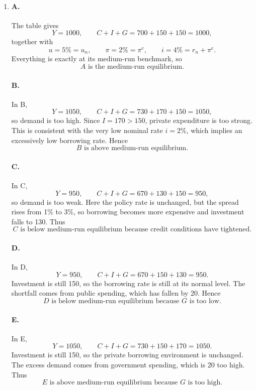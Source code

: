 \documentclass[12pt]{article}
\begin{document}
\begin{enumerate}[label=(\alph*)]
    \item
    \paragraph{A.}
    The table gives
    \[
    Y=1000,
    \qquad
    C+I+G=700+150+150=1000,
    \]
    together with
    \[
    u=5\%=u_n,
    \qquad
    \pi=2\%=\pi^e,
    \qquad
    i=4\%=r_n+\pi^e.
    \]
    Everything is exactly at its medium-run benchmark, so
    \[
    \boxed{A \text{ is the medium-run equilibrium.}}
    \]

    \paragraph{B.}
    In B,
    \[
    Y=1050,
    \qquad
    C+I+G=730+170+150=1050,
    \]
    so demand is too high. Since \(I=170>150\), private expenditure is too strong. This is consistent with the very low nominal rate \(i=2\%\), which implies an excessively low borrowing rate. Hence
    \[
    \boxed{B \text{ is above medium-run equilibrium.}}
    \]

    \paragraph{C.}
    In C,
    \[
    Y=950,
    \qquad
    C+I+G=670+130+150=950,
    \]
    so demand is too weak. Here the policy rate is unchanged, but the spread rises from 1\% to 3\%, so borrowing becomes more expensive and investment falls to 130. Thus
    \[
    \boxed{C \text{ is below medium-run equilibrium because credit conditions have tightened.}}
    \]

    \paragraph{D.}
    In D,
    \[
    Y=950,
    \qquad
    C+I+G=670+150+130=950.
    \]
    Investment is still 150, so the borrowing rate is still at its normal level. The shortfall comes from public spending, which has fallen by 20. Hence
    \[
    \boxed{D \text{ is below medium-run equilibrium because } G \text{ is too low.}}
    \]

    \paragraph{E.}
    In E,
    \[
    Y=1050,
    \qquad
    C+I+G=730+150+170=1050.
    \]
    Investment is still 150, so the private borrowing environment is unchanged. The excess demand comes from government spending, which is 20 too high. Thus
    \[
    \boxed{E \text{ is above medium-run equilibrium because } G \text{ is too high.}}
    \]


\end{enumerate}
\end{document}
